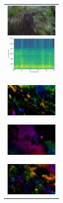 \begin{figure}[H]
\begin{tabular}{l}
\begin{minipage}{0.165\hsize}
\begin{center}
          \includegraphics[clip, width=2.5cm]{./Figures/still_run5.eps}
        \end{center}
      \end{minipage}
      \begin{minipage}{0.165\hsize}
        \begin{center}
          \includegraphics[clip, width=2.5cm]{./Figures/sound_run.eps}
        \end{center}
      \end{minipage}
\\  %
      \begin{minipage}{0.165\hsize}
        \begin{center}
          \includegraphics[clip, width=2.5cm]{./Figures/optic_run1.eps}
          \hspace{0.3cm} { }
        \end{center}
      \end{minipage}
      \begin{minipage}{0.165\hsize}
        \begin{center}
          \includegraphics[clip, width=2.5cm]{./Figures/optic_run2.eps}
          \hspace{0.0cm} { }
        \end{center}
      \end{minipage}
      \begin{minipage}{0.165\hsize}
        \begin{center}
          \includegraphics[clip, width=2.5cm]{./Figures/optic_run3.eps}

\end{center}
\end{minipage}
\end{tabular}
\end{figure}
